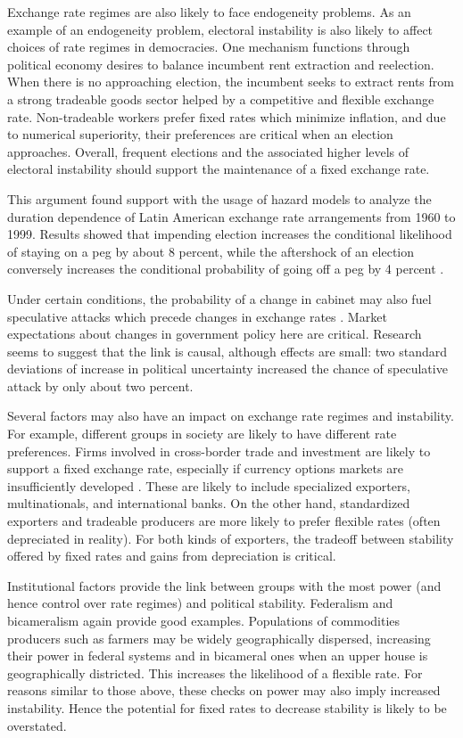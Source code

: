 \documentclass{article}
\begin{document}
    Exchange rate regimes are also likely to face endogeneity problems. As an example of an endogeneity problem, electoral instability is also likely to affect choices of rate regimes in democracies. One mechanism functions through political economy desires to balance incumbent rent extraction and reelection. When there is no approaching election, the incumbent seeks to extract rents from a strong tradeable goods sector helped by a competitive and flexible exchange rate. Non-tradeable workers prefer fixed rates which minimize inflation, and due to numerical superiority, their preferences are critical when an election approaches. Overall, frequent elections and the associated higher levels of electoral instability should support the maintenance of a fixed exchange rate.
   
    This argument found support with the usage of hazard models to analyze the duration dependence of Latin American exchange rate arrangements from 1960 to 1999. Results showed that impending election increases the conditional likelihood of staying on a peg by about 8 percent, while the aftershock of an election conversely increases the conditional probability of going off a peg by 4 percent \citep{blomberg_sustaining_2005}.
   
    Under certain conditions, the probability of a change in cabinet may also fuel speculative attacks which precede changes in exchange rates \citep{leblang_politics_2000}. Market expectations about changes in government policy here are critical. Research seems to suggest that the link is causal, although effects are small: two standard deviations of increase in political uncertainty increased the chance of speculative attack by only about two percent.
   
    Several factors may also have an impact on exchange rate regimes and instability. For example, different groups in society are likely to have different rate preferences. Firms involved in cross-border trade and investment are likely to support a fixed exchange rate, especially if currency options markets are insufficiently developed \citep{frieden_theory_2014}. These are likely to include specialized exporters, multinationals, and international banks. On the other hand, standardized exporters and tradeable producers are more likely to prefer flexible rates (often depreciated in reality). For both kinds of exporters, the tradeoff between stability offered by fixed rates and gains from depreciation is critical.
   
    Institutional factors provide the link between groups with the most power (and hence control over rate regimes) and political stability. Federalism and bicameralism again provide good examples. Populations of commodities producers such as farmers may be widely geographically dispersed, increasing their power in federal systems and in bicameral ones when an upper house is geographically districted. This increases the likelihood of a flexible rate. For reasons similar to those above, these checks on power may also imply increased instability. Hence the potential for fixed rates to decrease stability is likely to be overstated.
   
\end{document}
